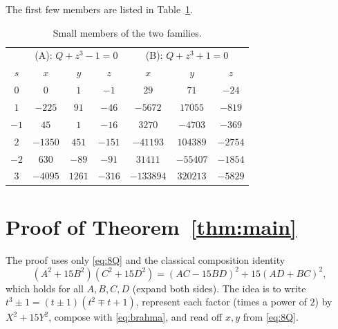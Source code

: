 \documentclass[11pt]{article}
\theoremstyle{remark}
\begin{document}
The first few members are listed in Table~\ref{tab:sol}.

\begin{table}[h]\centering
\begin{tabular}{c|ccc|ccc}
\toprule
 & \multicolumn{3}{c|}{(A): $Q+z^{3}-1=0$} & \multicolumn{3}{c}{(B): $Q+z^{3}+1=0$}\\
$s$ & $x$ & $y$ & $z$ & $x$ & $y$ & $z$\\
\midrule
$0$ & $0$ & $1$ & $-1$ & $29$ & $71$ & $-24$\\
$1$ & $-225$ & $91$ & $-46$ & $-5672$ & $17055$ & $-819$\\
$-1$ & $45$ & $1$ & $-16$ & $3270$ & $-4703$ & $-369$\\
$2$ & $-1350$ & $451$ & $-151$ & $-41193$ & $104389$ & $-2754$\\
$-2$ & $630$ & $-89$ & $-91$ & $31411$ & $-55407$ & $-1854$\\
$3$ & $-4095$ & $1261$ & $-316$ & $-133894$ & $320213$ & $-5829$\\
\bottomrule
\end{tabular}
\caption{Small members of the two families.}\label{tab:sol}
\end{table}

\section{Proof of Theorem~\ref{thm:main}}

The proof uses only \eqref{eq:8Q} and the classical composition identity
\begin{equation}\label{eq:brahma}
(A^{2}+15B^{2})(C^{2}+15D^{2})=(AC-15BD)^{2}+15(AD+BC)^{2},
\end{equation}
which holds for all $A,B,C,D$ (expand both sides). The idea is to write $t^{3}\pm1=(t\pm1)(t^{2}\mp t+1)$,
represent each factor (times a power of $2$) by $X^{2}+15Y^{2}$, compose with \eqref{eq:brahma},
and read off $x,y$ from \eqref{eq:8Q}.
\end{document}
